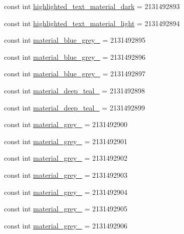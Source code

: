 \begin{CompactItemize}
\item 
const int \hyperlink{class__2doo_1_1_droid_1_1_resource_1_1_color_53282367f08ebb6afcf608a35620bbff}{highlighted\_\-text\_\-material\_\-dark} = 2131492893
\item 
const int \hyperlink{class__2doo_1_1_droid_1_1_resource_1_1_color_942158af14605dd555f5ea16bc7fdbc7}{highlighted\_\-text\_\-material\_\-light} = 2131492894
\item 
const int \hyperlink{class__2doo_1_1_droid_1_1_resource_1_1_color_21ac9fb86cbca05fb9852802038b1258}{material\_\-blue\_\-grey\_} = 2131492895
\item 
const int \hyperlink{class__2doo_1_1_droid_1_1_resource_1_1_color_9504b51593816e786684461d23bbbb6b}{material\_\-blue\_\-grey\_} = 2131492896
\item 
const int \hyperlink{class__2doo_1_1_droid_1_1_resource_1_1_color_8526fd1495df57e821c5e60588dcb5a1}{material\_\-blue\_\-grey\_} = 2131492897
\item 
const int \hyperlink{class__2doo_1_1_droid_1_1_resource_1_1_color_e7cd338586116696f03ddc8b1ec9c23d}{material\_\-deep\_\-teal\_} = 2131492898
\item 
const int \hyperlink{class__2doo_1_1_droid_1_1_resource_1_1_color_72d97a5b7c27db99ccc139e5e205d7a5}{material\_\-deep\_\-teal\_} = 2131492899
\item 
const int \hyperlink{class__2doo_1_1_droid_1_1_resource_1_1_color_6ee3cd9f8c9ea6c3ce2b81f4b0515a97}{material\_\-grey\_} = 2131492900
\item 
const int \hyperlink{class__2doo_1_1_droid_1_1_resource_1_1_color_3fa3a1e56f73d0ea11a4857be4bff80d}{material\_\-grey\_} = 2131492901
\item 
const int \hyperlink{class__2doo_1_1_droid_1_1_resource_1_1_color_39d427a81014fe106384260251259078}{material\_\-grey\_} = 2131492902
\item 
const int \hyperlink{class__2doo_1_1_droid_1_1_resource_1_1_color_f1374f8076dd591a9d15f310ff5f609b}{material\_\-grey\_} = 2131492903
\item 
const int \hyperlink{class__2doo_1_1_droid_1_1_resource_1_1_color_594551e5b19b7d734cc5ca86cad629c4}{material\_\-grey\_} = 2131492904
\item 
const int \hyperlink{class__2doo_1_1_droid_1_1_resource_1_1_color_aaa4cff1461c26be6c250fd89318131c}{material\_\-grey\_} = 2131492905
\item 
const int \hyperlink{class__2doo_1_1_droid_1_1_resource_1_1_color_82864afc914880f104c33c3c0bcec087}{material\_\-grey\_} = 2131492906

\end{CompactItemize}
